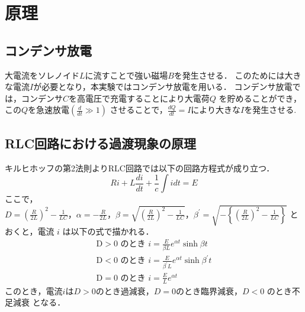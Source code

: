 
\section{原理}

\subsection{コンデンサ放電}
大電流をソレノイド$L$に流すことで強い磁場$B$を発生させる．
このためには大きな電流$I$が必要となり，本実験ではコンデンサ放電を用いる．
コンデンサ放電では，コンデンサ$C$を高電圧で充電することにより大電荷$Q$
を貯めることができ，この$Q$を急速放電$\left(\frac{d}{d t} \gg 1\right)$
させることで，$\frac{d Q}{d t}=I$により大きな$I$を発生させる.

\subsection{RLC回路における過渡現象の原理}
キルヒホッフの第2法則よりRLC回路では以下の回路方程式が成り立つ．
$$
R i+L\frac{di}{dt}+\frac{1}{c} \int i d t=E
$$
ここで，$D=\left(\frac{R}{2 L}\right)^2-\frac{1}{L C}， \alpha=-\frac{R}{2 L} ， \beta=\sqrt{\left(\frac{R}{2 L}\right)^2-\frac{1}{L C}}， \beta^{\prime}=\sqrt{-\left\{\left(\frac{R}{2 L}\right)^2-\frac{1}{L C}\right\}}$
とおくと，電流 $i$ は以下の式で描かれる．
$$
\begin{gathered}
\mathrm{D}>0 \text { のとき } i=\frac{E}{\beta L} e^{\alpha t} \sinh \beta t \\
\mathrm{D}<0 \text { のとき } i=\frac{E}{\beta^{\prime} L} e^{\alpha t} \sinh \beta^{\prime} t \\
\mathrm{D}=0 \text { のとき } i=\frac{E}{L} e^{\alpha t}
\end{gathered}
$$
このとき，電流$i$は$D>0$のとき過減衰，$D=0$のとき臨界減衰，$D<0$ のとき不足減衰
となる．


